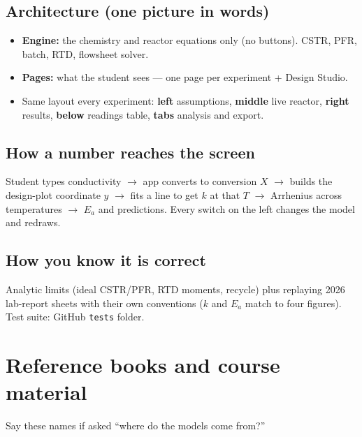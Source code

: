 \documentclass[11pt,a4paper]{article}
\begin{document}
\subsection{Architecture (one picture in words)}
\begin{itemize}
  \item \textbf{Engine:} the chemistry and reactor equations only (no buttons). CSTR, PFR, batch, RTD, flowsheet solver.
  \item \textbf{Pages:} what the student sees --- one page per experiment + Design Studio.
  \item Same layout every experiment: \textbf{left} assumptions, \textbf{middle} live reactor, \textbf{right} results,
  \textbf{below} readings table, \textbf{tabs} analysis and export.
\end{itemize}

\subsection{How a number reaches the screen}
Student types conductivity \(\to\) app converts to conversion \(X\) \(\to\) builds the design-plot coordinate \(y\) \(\to\)
fits a line to get \(k\) at that \(T\) \(\to\) Arrhenius across temperatures \(\to\) \(E_a\) and predictions. Every switch
on the left changes the model and redraws.

\subsection{How you know it is correct}
Analytic limits (ideal CSTR/PFR, RTD moments, recycle) plus replaying 2026 lab-report sheets with their own conventions
(\(k\) and \(E_a\) match to four figures). Test suite: GitHub \texttt{tests} folder.

\section{Reference books and course material}

Say these names if asked ``where do the models come from?''
\end{document}
